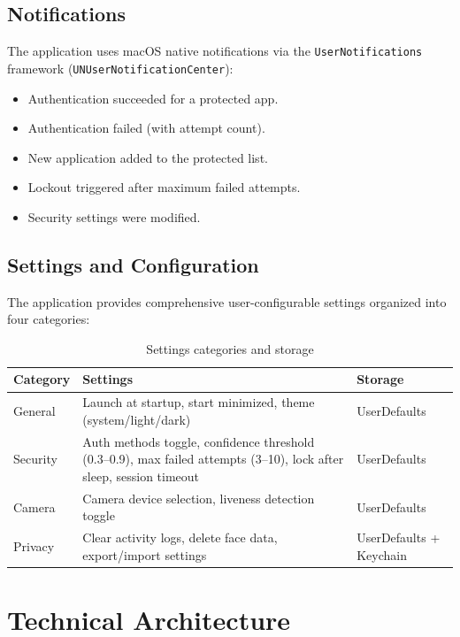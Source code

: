 \documentclass[12pt,a4paper]{report}
\begin{document}
\section{Notifications}
The application uses macOS native notifications via the \texttt{UserNotifications} framework (\texttt{UNUserNotificationCenter}):

\begin{itemize}[noitemsep]
    \item Authentication succeeded for a protected app.
    \item Authentication failed (with attempt count).
    \item New application added to the protected list.
    \item Lockout triggered after maximum failed attempts.
    \item Security settings were modified.
\end{itemize}

\section{Settings and Configuration}
The application provides comprehensive user-configurable settings organized into four categories:

\begin{table}[H]
\centering
\begin{tabularx}{\textwidth}{lXl}
\toprule
\textbf{Category} & \textbf{Settings} & \textbf{Storage} \\
\midrule
General & Launch at startup, start minimized, theme (system/light/dark) & UserDefaults \\
Security & Auth methods toggle, confidence threshold (0.3--0.9), max failed attempts (3--10), lock after sleep, session timeout & UserDefaults \\
Camera & Camera device selection, liveness detection toggle & UserDefaults \\
Privacy & Clear activity logs, delete face data, export/import settings & UserDefaults + Keychain \\
\bottomrule
\end{tabularx}
\caption{Settings categories and storage}
\end{table}

\chapter{Technical Architecture}
\end{document}
